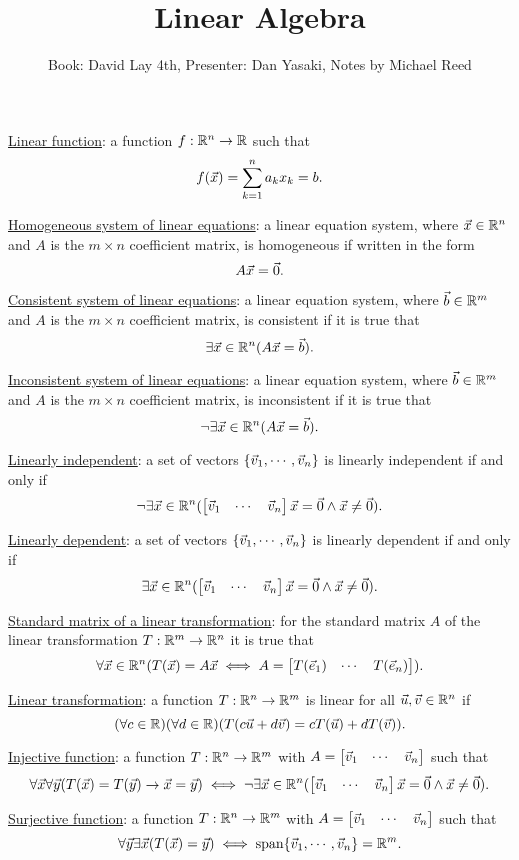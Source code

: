 \documentclass[10pt,a4paper]{article}
\author{Book: David Lay 4th, Presenter: Dan Yasaki, Notes by Michael Reed}
\title{Linear Algebra}
\date{}
\begin{document}
\maketitle

\underline{Linear function}: a function $f: \mathbb{R}^n \rightarrow \mathbb{R}$ such that
$$f(\vec{x}) = \sum_{k=1}^n a_k x_k = b.$$

\underline{Homogeneous system of linear equations}: a linear equation system, where $\vec{x}\in \mathbb{R}^n$ and $A$ is the $m\times n$ coefficient matrix, is homogeneous if written in the form $$A\vec{x}=\vec{0}.$$

\underline{Consistent system of linear equations}: a linear equation system, where $\vec{b}\in \mathbb{R}^m$ and $A$ is the $m\times n$ coefficient matrix, is consistent if it is true that
$$\exists \vec{x}\in\mathbb{R}^n(A\vec{x}=\vec{b}).$$

\underline{Inconsistent system of linear equations}: a linear equation system, where $\vec{b}\in \mathbb{R}^m$ and $A$ is the $m\times n$ coefficient matrix, is inconsistent if it is true that
$$\neg \exists \vec{x} \in \mathbb{R}^n (A\vec{x}=\vec{b}).$$

\underline{Linearly independent}: a set of vectors $\{\vec{v}_1,\cdots,\vec{v}_n\}$ is linearly independent if and only if %
$$\neg \exists \vec{x} \in \mathbb{R}^n ( \begin{bmatrix} \vec{v}_1 & \cdots & \vec{v}_n \end{bmatrix} \vec{x}=\vec{0} \land \vec{x}\neq\vec{0}).$$

\underline{Linearly dependent}: a set of vectors $\{\vec{v}_1,\cdots,\vec{v}_n\}$ is linearly dependent if and only if
$$\exists \vec{x} \in \mathbb{R}^n (\begin{bmatrix} \vec{v}_1 & \cdots & \vec{v}_n \end{bmatrix}\vec{x}=\vec{0} \land \vec{x}\neq \vec{0}).$$

\underline{Standard matrix of a linear transformation}: for the standard matrix $A$ of the linear transformation  $T:\mathbb{R}^m\rightarrow \mathbb{R}^n$ it is true that
$$\forall \vec{x}\in \mathbb{R}^n (T(\vec{x})=A\vec{x} \iff A = \begin{bmatrix} T(\vec{e}_1) & \cdots & T(\vec{e}_n) \end{bmatrix} ).$$

\underline{Linear transformation}: a function $T:\mathbb{R}^n\rightarrow \mathbb{R}^m$ is linear for all $\vec{u},\vec{v}\in \mathbb{R}^n$ if
$$(\forall c \in \mathbb{R} )(\forall d\in \mathbb{R}) (T(c\vec{u}+d\vec{v}) = cT(\vec{u}) + dT(\vec{v})).$$

\underline{Injective function}: a function $T:\mathbb{R}^n \rightarrow \mathbb{R}^m$ with $A = \begin{bmatrix} \vec{v}_1 & \cdots & \vec{v}_n \end{bmatrix}$ such that
$$\forall \vec{x} \forall \vec{y} (T(\vec{x})=T(\vec{y}) \rightarrow \vec{x}=\vec{y})\iff \neg \exists \vec{x} \in \mathbb{R}^n ( \begin{bmatrix} \vec{v}_1 & \cdots & \vec{v}_n \end{bmatrix} \vec{x}=\vec{0} \land \vec{x}\neq\vec{0}).$$

\underline{Surjective function}: a function $T:\mathbb{R}^n \rightarrow \mathbb{R}^m$ with $A = \begin{bmatrix} \vec{v}_1 & \cdots & \vec{v}_n \end{bmatrix}$ such that
$$\forall \vec{y} \exists \vec{x}(T(\vec{x})=\vec{y}) \iff \text{span}\{\vec{v}_1,\cdots,\vec{v}_n\} = \mathbb{R}^m.$$
\end{document}
